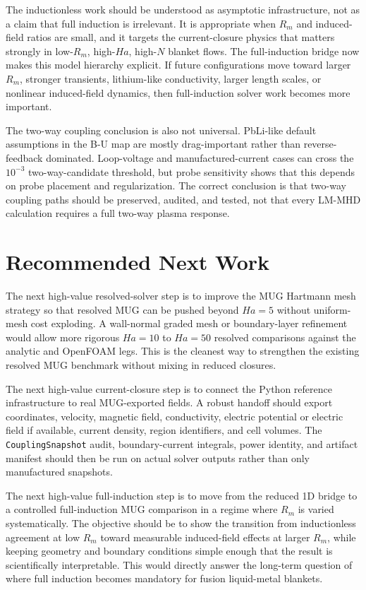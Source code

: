 \documentclass[11pt]{article}
\begin{document}
The inductionless work should be understood as asymptotic infrastructure, not as a claim that full induction is irrelevant. It is appropriate when \(R_m\) and induced-field ratios are small, and it targets the current-closure physics that matters strongly in low-\(R_m\), high-\(Ha\), high-\(N\) blanket flows. The full-induction bridge now makes this model hierarchy explicit. If future configurations move toward larger \(R_m\), stronger transients, lithium-like conductivity, larger length scales, or nonlinear induced-field dynamics, then full-induction solver work becomes more important.

The two-way coupling conclusion is also not universal. PbLi-like default assumptions in the B-U map are mostly drag-important rather than reverse-feedback dominated. Loop-voltage and manufactured-current cases can cross the \(10^{-3}\) two-way-candidate threshold, but probe sensitivity shows that this depends on probe placement and regularization. The correct conclusion is that two-way coupling paths should be preserved, audited, and tested, not that every LM-MHD calculation requires a full two-way plasma response.

\section{Recommended Next Work}

The next high-value resolved-solver step is to improve the MUG Hartmann mesh strategy so that resolved MUG can be pushed beyond \(Ha=5\) without uniform-mesh cost exploding. A wall-normal graded mesh or boundary-layer refinement would allow more rigorous \(Ha=10\) to \(Ha=50\) resolved comparisons against the analytic and OpenFOAM legs. This is the cleanest way to strengthen the existing resolved MUG benchmark without mixing in reduced closures.

The next high-value current-closure step is to connect the Python reference infrastructure to real MUG-exported fields. A robust handoff should export coordinates, velocity, magnetic field, conductivity, electric potential or electric field if available, current density, region identifiers, and cell volumes. The \texttt{CouplingSnapshot} audit, boundary-current integrals, power identity, and artifact manifest should then be run on actual solver outputs rather than only manufactured snapshots.

The next high-value full-induction step is to move from the reduced 1D bridge to a controlled full-induction MUG comparison in a regime where \(R_m\) is varied systematically. The objective should be to show the transition from inductionless agreement at low \(R_m\) toward measurable induced-field effects at larger \(R_m\), while keeping geometry and boundary conditions simple enough that the result is scientifically interpretable. This would directly answer the long-term question of where full induction becomes mandatory for fusion liquid-metal blankets.
\end{document}
